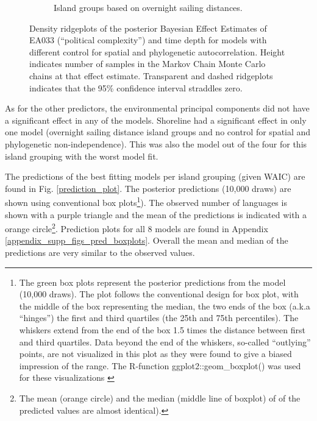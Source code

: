 \documentclass[unnumsec,webpdf,modern,medium]{oup-authoring-template}
\begin{document}
\begin{figure}
\begin{subfigure}{0.48\textwidth}
\caption{Island groups based on overnight sailing distances.}
\label{SBZR_ridge_panels_plot_time_pol_complex}
\end{subfigure}
\caption{Density ridgeplots of the posterior Bayesian Effect Estimates of EA033 (``political complexity'') and time depth for models with different control for spatial and phylogenetic autocorrelation. Height indicates number of samples in the Markov Chain Monte Carlo chains at that effect estimate. Transparent and dashed ridgeplots indicates that the 95\% confidence interval straddles zero. }
\label{Ridgeplots_pol_complex_time_depth}
\end{figure}

As for the other predictors, the environmental principal components did not have a significant effect in any of the models. Shoreline had a significant effect in only one model (overnight sailing distance island groups and no control for spatial and phylogenetic non-independence). This was also the model out of the four for this island grouping with the worst model fit. 

The predictions of the best fitting models per island grouping (given WAIC) are found in Fig. \ref{prediction_plot}. The posterior predictions (10,000 draws) are shown using conventional box plots\footnote{The green box plots represent the posterior predictions from the model (10,000 draws). The plot follows the conventional design for box plot, with the middle of the box representing the median, the two ends of the box (a.k.a ``hinges'') the first and third quartiles (the 25th and 75th percentiles). The whiskers extend from the end of the box 1.5 times the distance between first and third quartiles. Data beyond the end of the whiskers, so-called ``outlying'' points, are not visualized in this plot as they were found to give a biased impression of the range. The R-function  ggplot2::geom\_boxplot() was used for these visualizations \citep{R-ggplot2}}). The observed number of languages is shown with a purple triangle and the mean of the predictions is indicated with a orange circle\footnote{The mean (orange circle) and the median (middle line of boxplot) of of the predicted values are almost identical).}. Prediction plots for all 8 models are found in Appendix \ref{appendix_supp_figs_pred_boxplots}. Overall the mean and median of the predictions are very similar to the observed values.

\end{document}

